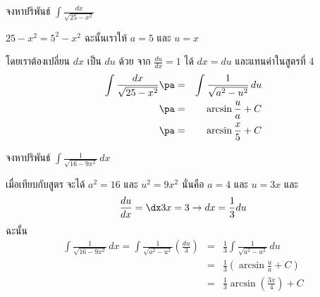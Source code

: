 \begin{frame}[t]
\begin{ex}
จงหาปริพันธ์ $\int \frac{dx}{\sqrt{25 - x^2}}$
\end{ex} \pa
\begin{sol}
$25 - x^2 = 5^2 - x^2$ \pa ฉะนั้นเราให้ $a = 5$ และ $u=x$ 

โดยเราต้องเปลี่ยน $dx$ เป็น $du$ ด้วย จาก $\frac{du}{dx} = 1$ ได้ $dx =du$ และแทนค่าในสูตรที่ 4 \pa
\begin{eqnarray*}
\int \frac{dx}{\sqrt{25 - x^2}} \pa &=& \int \frac{1}{\sqrt{a^2 - u^2}} \, du \\ \pa
&=& \arcsin \frac{u}{a} + C \\ \pa
&=& \arcsin \frac{x}{5} + C
\end{eqnarray*}
\end{sol}
\end{frame}

\begin{frame}[t]
\begin{ex}
จงหาปริพันธ์ $\int \frac{1}{\sqrt{16-9x^2}} \, dx$
\end{ex}
\begin{sol}
เมื่อเทียบกับสูตร จะได้ $a^2 = 16$ และ $u^2 = 9x^2$ นั่นคือ $a = 4$ และ $u = 3x$ และ
\[ \frac{du}{dx} = \dx 3x = 3 \rightarrow dx = \frac{1}{3} du\]
ฉะนั้น
\begin{eqnarray*}
\int \frac{1}{\sqrt{16-9x^2}} \, dx = \int \frac{1}{\sqrt{a^2-u^2}} \left(\frac{du}{3}\right) &=& \frac{1}{3} \int \frac{1}{\sqrt{a^2-u^2}} \, du \\
&=& \frac{1}{3} \left( \arcsin \frac{u}{a} + C \right)\\
&=& \frac{1}{3} \arcsin \left(\frac{3x}{4}\right) + C
\end{eqnarray*}
\end{sol}
\end{frame}
